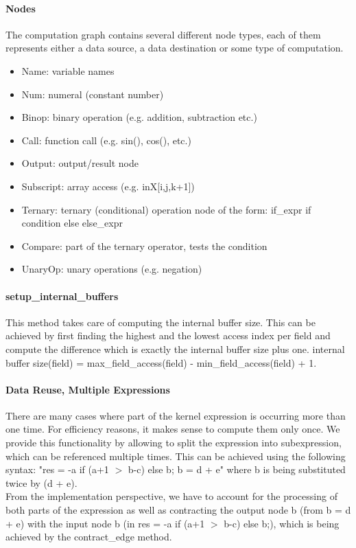 \paragraph{Nodes}
The computation graph contains several different node types, each of them represents either a data source, a data destination or some type of computation.
\begin{itemize}
	\item Name: variable names
	\item Num: numeral (constant number)
	\item Binop: binary operation (e.g. addition, subtraction etc.)
	\item Call: function call (e.g. sin(), cos(), etc.)
	\item Output: output/result node
	\item Subscript: array access (e.g. inX[i,j,k+1])
	\item Ternary: ternary (conditional) operation node of the form: if\_expr if condition else else\_expr
	\item Compare: part of the ternary operator, tests the condition
	\item UnaryOp: unary operations (e.g. negation)
\end{itemize}


\paragraph{setup\_internal\_buffers}
This method takes care of computing the internal buffer size. This can be achieved by first finding the highest and the lowest access index per field and compute the difference which is exactly the internal buffer size plus one. internal buffer size(field) = max\_field\_access(field) - min\_field\_access(field) + 1.


\paragraph{Data Reuse, Multiple Expressions}
There are many cases where part of the kernel expression is occurring more than one time. For efficiency reasons, it makes sense to compute them only once. We provide this functionality by allowing to split the expression into subexpression, which can be referenced multiple times. This can be achieved using the following syntax: "res = -a if (a+1 $>$ b-c) else b; b = d + e" where b is being substituted twice by (d + e). \\
From the implementation perspective, we have to account for the processing of both parts of the expression as well as contracting the output node b (from b = d + e) with the input node b (in res = -a if (a+1 $>$ b-c) else b;), which is being achieved by the contract\_edge method.


